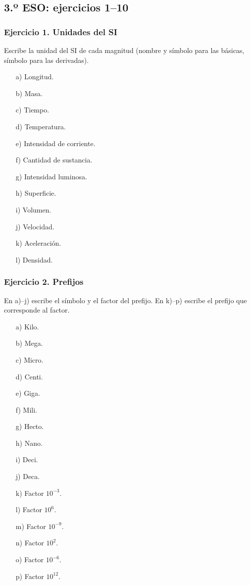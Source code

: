 \subsection{3.º ESO: ejercicios 1--10}

\subsubsection*{Ejercicio 1. Unidades del SI}

Escribe la unidad del SI de cada magnitud (nombre y símbolo para las básicas, símbolo para las derivadas).

\begin{enumerate}
    \item[a)] Longitud.
    \item[b)] Masa.
    \item[c)] Tiempo.
    \item[d)] Temperatura.
    \item[e)] Intensidad de corriente.
    \item[f)] Cantidad de sustancia.
    \item[g)] Intensidad luminosa.
    \item[h)] Superficie.
    \item[i)] Volumen.
    \item[j)] Velocidad.
    \item[k)] Aceleración.
    \item[l)] Densidad.
\end{enumerate}

\subsubsection*{Ejercicio 2. Prefijos}

En a)--j) escribe el símbolo y el factor del prefijo.
En k)--p) escribe el prefijo que corresponde al factor.

\begin{enumerate}
    \item[a)] Kilo.
    \item[b)] Mega.
    \item[c)] Micro.
    \item[d)] Centi.
    \item[e)] Giga.
    \item[f)] Mili.
    \item[g)] Hecto.
    \item[h)] Nano.
    \item[i)] Deci.
    \item[j)] Deca.
    \item[k)] Factor $10^{-3}$.
    \item[l)] Factor $10^6$.
    \item[m)] Factor $10^{-9}$.
    \item[n)] Factor $10^2$.
    \item[o)] Factor $10^{-6}$.
    \item[p)] Factor $10^{12}$.
\end{enumerate}

